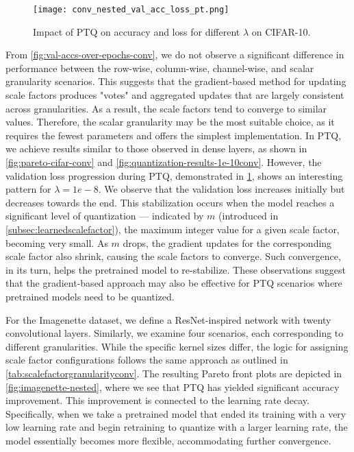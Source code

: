 \begin{figure}[t!]
  \centering
  \texttt{[image: conv\_nested\_val\_acc\_loss\_pt.png]}
  \caption{Impact of PTQ on accuracy and loss for different \( \lambda \) on CIFAR-10.}
  \label{fig:val-accs-over-epochs-conv-pt}
\end{figure}

From \cref{fig:val-accs-over-epochs-conv}, 
we do not observe a significant difference in performance between the row-wise, 
column-wise, channel-wise, 
and scalar granularity scenarios. 
This suggests that the gradient-based method for updating scale factors produces 
"votes" and aggregated updates that are largely consistent across granularities. 
As a result, the scale factors tend to converge to similar values. 
Therefore, the scalar granularity may be the most suitable choice, 
as it requires the fewest parameters and offers the simplest implementation.
\newpage
In PTQ, we achieve results similar to those observed in dense layers, as shown in
\cref{fig:pareto-cifar-conv} and \cref{fig:quantization-results-1e-10conv}.
However, the validation loss progression during PTQ, demonstrated in \cref{fig:val-accs-over-epochs-conv-pt},
shows an interesting pattern for  \( \lambda = 1e-8\).
We observe that the validation loss increases initially but decreases towards the end. 
This stabilization occurs when the model reaches a significant level of quantization
— indicated by \( m \) (introduced in \cref{subsec:learnedscalefactor}), the maximum integer value for a given scale factor, becoming very small.
As  \( m \) drops, the gradient updates for the corresponding scale factor also shrink, 
causing the scale factors to converge. Such convergence, in its turn, helps the pretrained
model to re-stabilize. These observations suggest that the gradient-based approach 
may also be effective for PTQ scenarios where pretrained models need to be quantized.

For the Imagenette dataset, 
we define a ResNet-inspired network with twenty convolutional layers. 
Similarly, we examine four scenarios, each corresponding to different granularities.
While the specific kernel sizes differ, the logic for assigning scale factor configurations 
follows the same approach as outlined in \cref{tab:scalefactorgranularityconv}.
\newpage
The resulting Pareto front plots are depicted in \cref{fig:imagenette-nested}, 
where we see that PTQ has yielded significant accuracy improvement. 
This improvement is connected to the learning rate decay. Specifically, when we take a pretrained model that
ended its training with a very low learning rate and begin retraining to quantize with a larger learning rate,
the model essentially becomes more flexible, accommodating further convergence.

